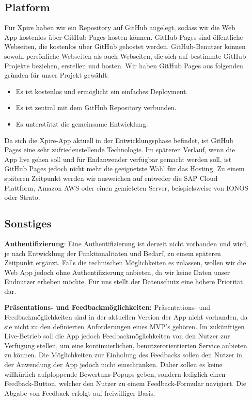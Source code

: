 \subsection{Platform}
Für Xpire haben wir ein Repository auf GitHub angelegt, sodass wir die Web App kostenlos über GitHub Pages hosten können. GitHub Pages sind öffentliche Webseiten, die kostenlos über GitHub gehostet werden. GitHub-Benutzer können sowohl persönliche Webseiten als auch Webseiten, die sich auf bestimmte GitHub-Projekte beziehen, erstellen und hosten. Wir haben GitHub Pages aus folgenden gründen für unser Projekt gewählt:
\begin{itemize}[noitemsep]
	\item Es ist kostenlos und ermöglicht ein einfaches Deployment.
	\item Es ist zentral mit dem GitHub Repository verbunden.
	\item Es unterstützt die gemeinsame Entwicklung.
\end{itemize}
Da sich die Xpire-App aktuell in der Entwicklungsphase befindet, ist GitHub Pages eine sehr zufriedenstellende Technologie. Im späteren Verlauf, wenn die App live gehen soll und für Endanwender verfügbar gemacht werden soll, ist GitHub Pages jedoch nicht mehr die geeignetste Wahl für das Hosting. Zu einem späteren Zeitpunkt werden wir ausweichen auf entweder die SAP Cloud Plattform, Amazon AWS oder einen gemieteten Server, beispielsweise von IONOS oder Strato.

\subsection{Sonstiges}
\textbf{Authentifizierung}: Eine Authentifizierung ist derzeit nicht vorhanden und wird, je nach Entwicklung der Funktionalitäten und Bedarf, zu einem späteren Zeitpunkt ergänzt. Falls die technischen Möglichkeiten es zulassen, wollen wir die Web App jedoch ohne Authentifizierung anbieten, da wir keine Daten unser Endnutzer erheben möchte. Für uns stellt der Datenschutz eine höhere Priorität dar.

\textbf{Präsentations- und Feedbackmöglichkeiten:} Präsentations- und Feedbackmöglichkeiten sind in der aktuellen Version der App nicht vorhanden, da sie nicht zu den definierten Anforderungen eines MVP's gehören. Im zukünftigen Live-Betrieb soll die App jedoch Feedbackmöglichkeiten von den Nutzer zur Verfügung stellen, um eine kontinuierlichen, benutzerorientierten Service anbieten zu können. Die Möglichkeiten zur Einholung des Feedbacks sollen den Nutzer in der Anwendung der App jedoch nicht einschränken. Daher sollen es keine willkürlich aufploppende Bewertuns-Popups geben, sondern lediglich einen Feedback-Button, welcher den Nutzer zu einem Feedback-Formular navigiert. Die Abgabe von Feedback erfolgt auf freiwilliger Basis.
	


